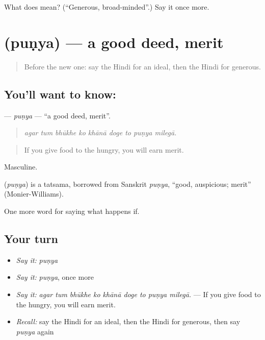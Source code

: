 \begin{tcolorbox}[breakable,colback=teal!4,colframe=teal!35!black,title={Before you move on}]
What does  mean? (\textquotedblleft{}Generous, broad-minded\textquotedblright{}.) Say it once more.
\end{tcolorbox}
\section[\texorpdfstring{\hi{पुण्य} (puṇya)}{पुण्य (puṇya)}]{ (puṇya) — a good deed, merit}

\label{lesson:HI-C396-punya}



\begin{quote}
Before the new one: say the Hindi for an ideal, then the Hindi for generous.
\end{quote}

\subsection*{You'll want to know: }
\textbf{} — \emph{puṇya} — \textquotedblleft{}a good deed, merit\textquotedblright{}.

\begin{quote}
        
\end{quote}

\begin{quote}
\emph{agar tum bhūkhe ko khānā doge to puṇya milegā.}
\end{quote}

\begin{quote}
If you give food to the hungry, you will earn merit.
\end{quote}

Masculine.

\begin{cousinweb}
\textbf{} (\emph{puṇya}) is a tatsama, borrowed from Sanskrit \emph{puṇya}, \textquotedblleft{}good, auspicious; merit\textquotedblright{} (Monier-Williams).
\end{cousinweb}

\begin{grammarlens}[title={What you've built}]
One more word for saying what happens if.
\end{grammarlens}

\subsection*{Your turn}
\begin{itemize}
\raggedright
  \item \emph{Say it:} \emph{puṇya}
  \item \emph{Say it:} \emph{puṇya}, once more
  \item \emph{Say it:} \emph{agar tum bhūkhe ko khānā doge to puṇya milegā.} — If you give food to the hungry, you will earn merit.
  \item \emph{Recall:} say the Hindi for an ideal, then the Hindi for generous, then say \emph{puṇya} again
\end{itemize}

